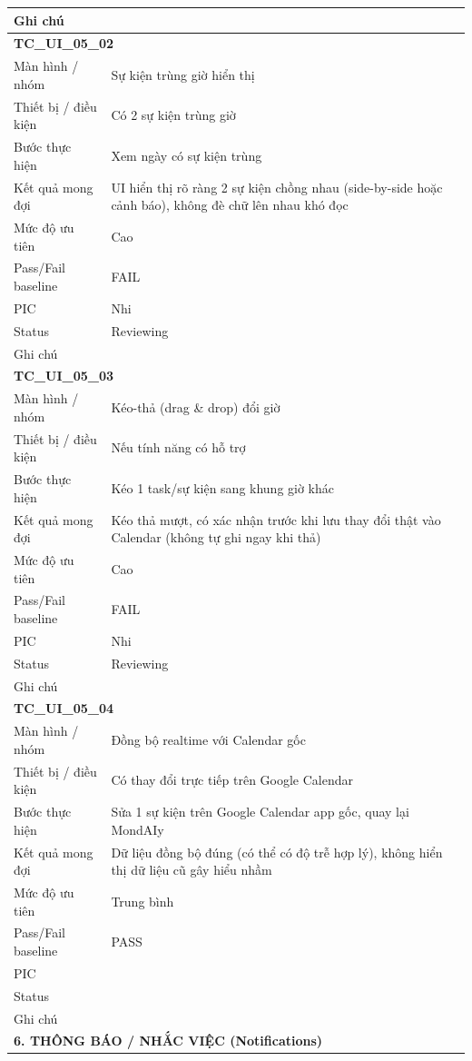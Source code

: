 \documentclass[12pt,a4paper]{article}
\begin{document}
\begin{longtable}{p{3.0cm}p{11.5cm}}
Ghi chú &  \\
\midrule
\multicolumn{2}{l}{\textbf{TC\_UI\_05\_02}} \\
Màn hình / nhóm & Sự kiện trùng giờ hiển thị \\
Thiết bị / điều kiện & Có 2 sự kiện trùng giờ \\
Bước thực hiện & Xem ngày có sự kiện trùng \\
Kết quả mong đợi & UI hiển thị rõ ràng 2 sự kiện chồng nhau (side-by-side hoặc cảnh báo), không đè chữ lên nhau khó đọc \\
Mức độ ưu tiên & Cao \\
Pass/Fail baseline & FAIL \\
PIC & Nhi \\
Status & Reviewing \\
Ghi chú &  \\
\midrule
\multicolumn{2}{l}{\textbf{TC\_UI\_05\_03}} \\
Màn hình / nhóm & Kéo-thả (drag \& drop) đổi giờ \\
Thiết bị / điều kiện & Nếu tính năng có hỗ trợ \\
Bước thực hiện & Kéo 1 task/sự kiện sang khung giờ khác \\
Kết quả mong đợi & Kéo thả mượt, có xác nhận trước khi lưu thay đổi thật vào Calendar (không tự ghi ngay khi thả) \\
Mức độ ưu tiên & Cao \\
Pass/Fail baseline & FAIL \\
PIC & Nhi \\
Status & Reviewing \\
Ghi chú &  \\
\midrule
\multicolumn{2}{l}{\textbf{TC\_UI\_05\_04}} \\
Màn hình / nhóm & Đồng bộ realtime với Calendar gốc \\
Thiết bị / điều kiện & Có thay đổi trực tiếp trên Google Calendar \\
Bước thực hiện & Sửa 1 sự kiện trên Google Calendar app gốc, quay lại MondAIy \\
Kết quả mong đợi & Dữ liệu đồng bộ đúng (có thể có độ trễ hợp lý), không hiển thị dữ liệu cũ gây hiểu nhầm \\
Mức độ ưu tiên & Trung bình \\
Pass/Fail baseline & PASS \\
PIC &  \\
Status &  \\
Ghi chú &  \\
\midrule
\multicolumn{2}{l}{\textbf{6. THÔNG BÁO / NHẮC VIỆC (Notifications)}} \\ \midrule

\end{longtable}
\end{document}
